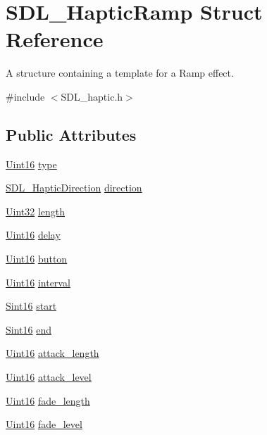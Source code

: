 \hypertarget{structSDL__HapticRamp}{}\section{S\+D\+L\+\_\+\+Haptic\+Ramp Struct Reference}
\label{structSDL__HapticRamp}


A structure containing a template for a Ramp effect.  




{\ttfamily \#include $<$S\+D\+L\+\_\+haptic.\+h$>$}

\subsection*{Public Attributes}
\begin{DoxyCompactItemize}
\item 
\hyperlink{SDL__stdinc_8h_a31fcc0a076c9068668173ee26d33e42b}{Uint16} \hyperlink{structSDL__HapticRamp_aca1c2349372433822ab62f60976640aa}{type}
\item 
\hyperlink{structSDL__HapticDirection}{S\+D\+L\+\_\+\+Haptic\+Direction} \hyperlink{structSDL__HapticRamp_a6fb6c67ccf262b8f3ec08bcdf08f9965}{direction}
\item 
\hyperlink{SDL__stdinc_8h_add440eff171ea5f55cb00c4a9ab8672d}{Uint32} \hyperlink{structSDL__HapticRamp_a57e75237507701405af2a3caf34cdb5a}{length}
\item 
\hyperlink{SDL__stdinc_8h_a31fcc0a076c9068668173ee26d33e42b}{Uint16} \hyperlink{structSDL__HapticRamp_ac9471016f41919b4a1c786bbd649a777}{delay}
\item 
\hyperlink{SDL__stdinc_8h_a31fcc0a076c9068668173ee26d33e42b}{Uint16} \hyperlink{structSDL__HapticRamp_a2027c6fd88f1ebe652c90c71410ee0bf}{button}
\item 
\hyperlink{SDL__stdinc_8h_a31fcc0a076c9068668173ee26d33e42b}{Uint16} \hyperlink{structSDL__HapticRamp_a4b89d108cfa7e96ea58b58771334c33d}{interval}
\item 
\hyperlink{SDL__stdinc_8h_a9d0257032c0e146ab6121bf0122712f5}{Sint16} \hyperlink{structSDL__HapticRamp_acc0e813ac6399290fd4a788d2471e8d4}{start}
\item 
\hyperlink{SDL__stdinc_8h_a9d0257032c0e146ab6121bf0122712f5}{Sint16} \hyperlink{structSDL__HapticRamp_a16dd3ee307795248e21ee45ba8fb4c6c}{end}
\item 
\hyperlink{SDL__stdinc_8h_a31fcc0a076c9068668173ee26d33e42b}{Uint16} \hyperlink{structSDL__HapticRamp_adbcd7ffb05016d442c73e81cc0fcbbd2}{attack\+\_\+length}
\item 
\hyperlink{SDL__stdinc_8h_a31fcc0a076c9068668173ee26d33e42b}{Uint16} \hyperlink{structSDL__HapticRamp_a755933bbda14ae9b53c574b9fe6291a0}{attack\+\_\+level}
\item 
\hyperlink{SDL__stdinc_8h_a31fcc0a076c9068668173ee26d33e42b}{Uint16} \hyperlink{structSDL__HapticRamp_ad58a8f7cfdf659b45f0503fc56db7436}{fade\+\_\+length}
\item 
\hyperlink{SDL__stdinc_8h_a31fcc0a076c9068668173ee26d33e42b}{Uint16} \hyperlink{structSDL__HapticRamp_a66b586f2e6a23a085a7b2854f61752c5}{fade\+\_\+level}
\end{DoxyCompactItemize}



